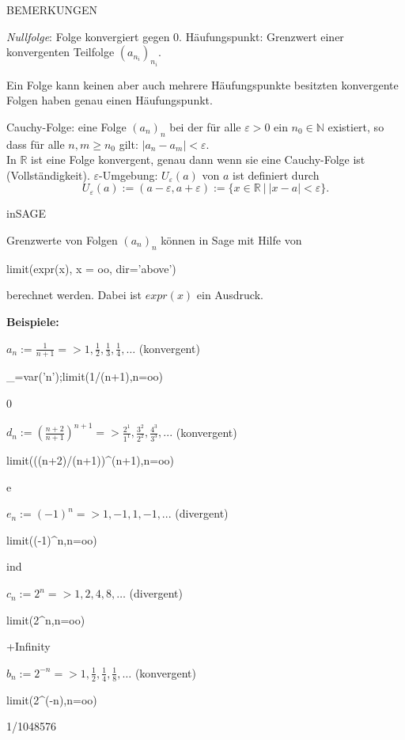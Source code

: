 \documentclass[fontsize=12pt,paper=a4,twoside,bibtotoc,idxtotoc,
liststotoc,pagesize,BCOR1.2cm,DIV15,chapterprefix,pagesize=pdftex]{scrbook}
\theoremstyle{plain}
\theoremstyle{definition}
\theoremstyle{remark}
\begin{document}
BEMERKUNGEN


 \emph{Nullfolge}: Folge konvergiert gegen $0$.
 {\color{red} Häufungspunkt}: Grenzwert einer konvergenten Teilfolge $(a_{n_i})_{n_i}$.

 Ein Folge kann keinen aber auch mehrere Häufungspunkte besitzten
 konvergente Folgen haben genau einen Häufungspunkt.

  {\color{red} Cauchy-Folge}: eine Folge $(a_n)_n$ bei der für
alle $\varepsilon>0$ ein $n_0 \in \mathbb{N}$ existiert, so dass für alle
$n,m \geq n_0$ gilt:
$|a_n - a_m| < \varepsilon$. \\
 In $\mathbb{R}$ ist eine Folge konvergent,
genau dann wenn sie eine Cauchy-Folge ist (Vollständigkeit).
 {\color{red} $\varepsilon$-Umgebung}: $U_\varepsilon(a)$ von $a$ ist
definiert durch
\[
U_\varepsilon(a) := (a-\varepsilon, a+\varepsilon) := \{ x \in \mathbb{R} \ | \ |x - a| < \varepsilon \}.
\] 


inSAGE

Grenzwerte von Folgen $(a_n)_n$ können in Sage mit Hilfe von 
\begin{sagein}
limit(expr(x), x = oo, dir='above')
\end{sagein}
berechnet werden. Dabei ist $expr(x)$ ein Ausdruck.

\textbf{Beispiele:}

  $a_n:= \frac{1}{n+1} => 1, \frac{1}{2}, \frac{1}{3}, \frac{1}{4}, \ldots$  (konvergent)
\begin{sagein}
_=var('n');limit(1/(n+1),n=oo)
\end{sagein}
\begin{sage}
  0
\end{sage}
 $d_n:=\left( \frac{n+2}{n+1} \right)^{n+1} => \frac{2^1}{1^1},\frac{3^2}{2^2}, \frac{4^3}{3^3},...$ (konvergent)
\begin{sagein}
limit(((n+2)/(n+1))^(n+1),n=oo)
\end{sagein}
\begin{sage}
  e
\end{sage}
 $e_n:=(-1)^n => 1,-1,1,-1,...$ (divergent)
\begin{sagein}
limit((-1)^n,n=oo)
\end{sagein}
\begin{sage}
  ind
\end{sage}
 $c_n:=2^n => 1,2,4,8,\ldots$ (divergent)
\begin{sagein}
limit(2^n,n=oo)
\end{sagein}
\begin{sage}
  +Infinity
\end{sage}
  $b_n:= 2^{-n} => 1,\frac{1}{2}, \frac{1}{4}, \frac{1}{8}, \ldots$ (konvergent)
\begin{sagein}
limit(2^(-n),n=oo)
\end{sagein}
\begin{sage}
  1/1048576
\end{sage}
\end{document}
